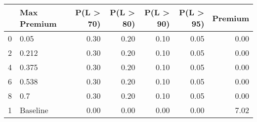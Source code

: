\begin{tabular}{llrrrrr}
\toprule
{} & Max Premium &  P(L > 70) &  P(L > 80) &  P(L > 90) &  P(L > 95) &  Premium \\
\midrule
0 &        0.05 &       0.30 &       0.20 &       0.10 &       0.05 &     0.00 \\
2 &       0.212 &       0.30 &       0.20 &       0.10 &       0.05 &     0.00 \\
4 &       0.375 &       0.30 &       0.20 &       0.10 &       0.05 &     0.00 \\
6 &       0.538 &       0.30 &       0.20 &       0.10 &       0.05 &     0.00 \\
8 &         0.7 &       0.30 &       0.20 &       0.10 &       0.05 &     0.00 \\
1 &    Baseline &       0.00 &       0.00 &       0.00 &       0.00 &     7.02 \\
\bottomrule
\end{tabular}
